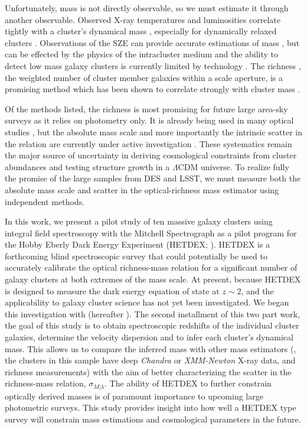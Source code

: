 Unfortunately, mass is not directly observable, so we must estimate it through another observable. Observed X-ray temperatures and luminosities correlate tightly with a cluster's dynamical mass , especially for dynamically relaxed clusters . Observations of the SZE can provide accurate estimations of mass , but can be effected by the physics of the intracluster medium  and the ability to detect low mass galaxy clusters is currently limited by technology . The richness , the weighted number of cluster member galaxies within a scale aperture, is a promising method which has been shown to correlate strongly with cluster mass . 

Of the methods listed, the richness is most promising for future large area-sky surveys as it relies on photometry only. It is already being used in many optical studies , but the absolute mass scale and more importantly the  intrinsic scatter in the relation are currently under active investigation . These systematics remain the major source of uncertainty in deriving cosmological constraints from cluster abundances and testing structure growth in a $\Lambda$CDM universe. To realize fully the promise of the large samples from DES and LSST, we must measure both the absolute mass scale and scatter in the optical-richness mass estimator using independent methods.

In this work, we present a pilot study of ten massive galaxy clusters using integral field spectroscopy with the Mitchell Spectrograph as a pilot program for the Hobby Eberly Dark Energy Experiment (HETDEX; \citealt{Hill2008}). HETDEX is a forthcoming blind spectroscopic survey that could potentially be used to accurately calibrate the optical richness-mass relation for a significant number of galaxy clusters at both extremes of the mass scale. At present, because HETDEX is designed to measure the dark energy equation of state at $z\sim2$, and the applicability to galaxy cluster science has not yet been investigated. We began this investigation with \cite{Boada2016} (hereafter ). The second installment of this two part work, the goal of this study is to obtain spectroscopic redshifts of the individual cluster galaxies, determine the velocity dispersion and to infer each cluster's dynamical mass. This allows us to compare the inferred mass with other mass estimators (\eg, the clusters in this sample have deep \textit{Chandra} or \textit{XMM-Newton} X-ray data, and richness measurements) with the aim of better characterizing the scatter in the richness-mass relation, $\sigma_{M|\lambda}$. The ability of HETDEX to further constrain optically derived masses is of paramount importance to upcoming large photometric surveys. This study provides insight into how well a HETDEX type survey will constrain mass estimations and cosmological parameters in the future.

